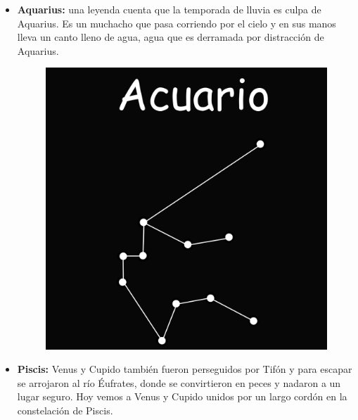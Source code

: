 \documentclass[10pt,a4paper]{article}
\begin{document}
\begin{itemize}
 \item \textbf{Aquarius:} una leyenda cuenta que la temporada de lluvia es culpa de Aquarius. Es un muchacho que pasa corriendo por el cielo y en sus manos lleva un canto lleno de agua, agua que es derramada por distracción de Aquarius.
 
 \begin{figure}[H]
\centering
\includegraphics[scale=0.18]{Imagenes/Acuario_01}
\end{figure} 
 
 \item \textbf{Piscis:} Venus y Cupido también fueron perseguidos por Tifón y para escapar se arrojaron al río Éufrates, donde se convirtieron en peces y nadaron a un lugar seguro. Hoy vemos a Venus y Cupido unidos por un largo cordón en la constelación de Piscis.
 

\end{itemize}
\end{document}
